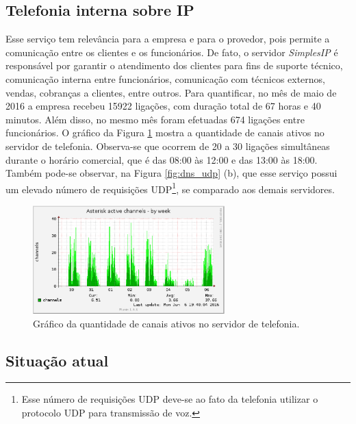 \subsection{Telefonia interna sobre IP}
\label{section:telefonia}

Esse serviço tem relevância para a empresa e para o provedor, pois permite a comunicação entre os clientes e os funcionários. De fato, o 
servidor \textit{SimplesIP} é responsável por garantir o atendimento dos clientes para fins de suporte técnico, comunicação interna entre 
funcionários, comunicação com técnicos externos, vendas, cobranças a clientes, entre outros. Para quantificar, no mês de maio de 2016 a empresa 
recebeu 15922 ligações, com duração total de 67 horas e 40 minutos. Além disso, no mesmo mês foram efetuadas 674 ligações entre funcionários. 
O gráfico da Figura \ref{fig:simplesip_week} mostra a quantidade de canais ativos no servidor de telefonia. Observa-se que ocorrem 
de 20 a 30 ligações simultâneas durante o horário comercial, que é das 08:00 às 12:00 e das 13:00 às 18:00. Também pode-se observar, na Figura 
\ref{fig:dns_udp} (b), que esse serviço possui um elevado número de requisições \ac{UDP}\footnote[2]{Esse número de requisições \ac{UDP} 
deve-se ao fato da telefonia utilizar o protocolo \ac{UDP} para transmissão de voz.}, se comparado aos demais servidores.

\begin{figure}[h!]
 \centering
 \includegraphics[width=280px]{img/simplesip_week.eps}
 \caption{Gráfico da quantidade de canais ativos no servidor de telefonia.}
 \label{fig:simplesip_week}
\end{figure}

\subsection{Situação atual}
\label{section:maqservcrit}


